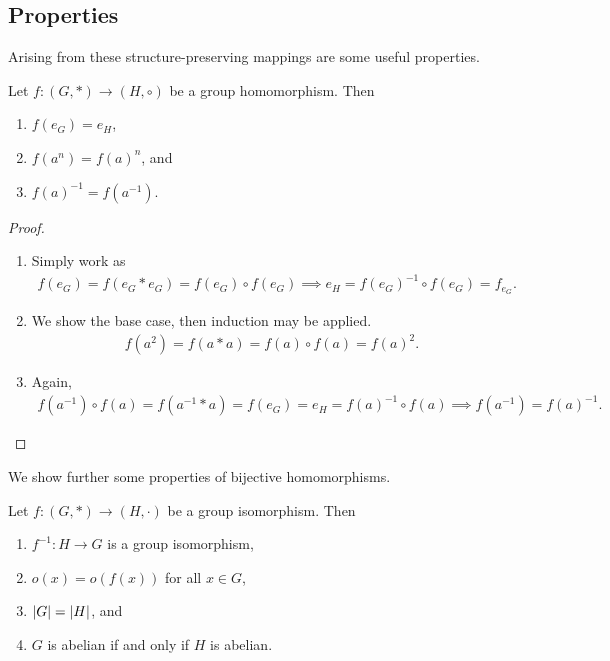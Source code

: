 \subsection{Properties}

Arising from these structure-preserving mappings are some useful properties.

\begin{proposition}
    Let $f:(G,\ast) \to (H,\circ)$ be a group homomorphism. Then
    \begin{enumerate}
        \item $f(e_{G}) = e_{H}$,
        \item $f(a^{n}) = f(a)^{n}$, and
        \item $f(a)^{-1} = f(a^{-1})$.
    \end{enumerate}
\end{proposition}
\begin{proof}
    \begin{enumerate}
        \item Simply work as
        \begin{align}
            f(e_{G}) = f(e_{G} \ast e_{G}) = f(e_{G}) \circ f(e_{G}) \implies e_{H} = f(e_{G})^{-1} \circ f(e_{G}) = f_{e_{G}}.
        \end{align}

        \item We show the base case, then induction may be applied.
        \begin{align}
            f(a^{2}) = f(a \ast a) = f(a) \circ f(a) = f(a)^{2}.
        \end{align}

        \item Again,
        \begin{align}
            f(a^{-1}) \circ f(a) = f(a^{-1} \ast a) = f(e_{G}) = e_{H} = f(a)^{-1} \circ f(a) \implies f(a^{-1}) = f(a)^{-1}.
        \end{align}
    \end{enumerate}
\end{proof}

We show further some properties of bijective homomorphisms.

\begin{proposition}
    Let $f:(G,\ast) \to (H,\cdot)$ be a group isomorphism. Then
    \begin{enumerate}
        \item $f^{-1}:H \to G$ is a group isomorphism,
        \item $o(x) = o(f(x))$ for all $x \in G$,
        \item $\left| G \right| = \left| H \right|$, and
        \item $G$ is abelian if and only if $H$ is abelian.
    \end{enumerate}
\end{proposition}

